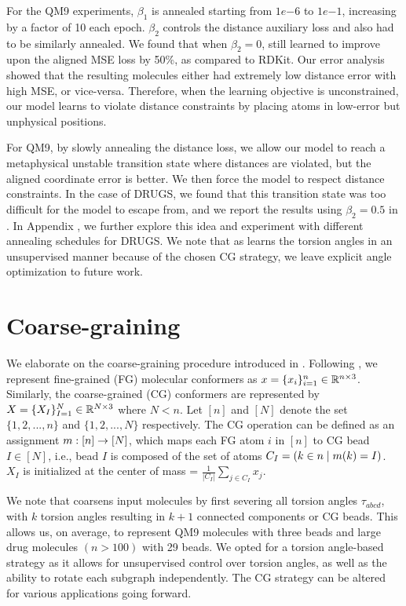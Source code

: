 For the QM9 experiments, $\beta_1$ is annealed starting from $1e{-6}$ to $1e{-1}$, increasing by a factor of 10 each epoch. $\beta_2$ controls the distance auxiliary loss and also had to be similarly annealed. We found that when $\beta_2 = 0$, \model still learned to improve upon the aligned MSE loss by 50\%, as compared to RDKit. Our error analysis showed that the resulting molecules either had extremely low distance error with high MSE, or vice-versa. Therefore, when the learning objective is unconstrained, our model learns to violate distance constraints by placing atoms in low-error but unphysical positions.

For QM9, by slowly annealing the distance loss, we allow our model to reach a metaphysical unstable transition state where distances are violated, but the aligned coordinate error is better. We then force the model to respect distance constraints. In the case of DRUGS, we found that this transition state was too difficult for the model to escape from, and we report the results using $\beta_2 = 0.5$ in . In Appendix , we further explore this idea and experiment with different annealing schedules for DRUGS. 
We note that as \model learns the torsion angles in an unsupervised manner because of the chosen CG strategy, we leave explicit angle optimization to future work.

\section{Coarse-graining}
\label{section:appendix-CG}
\vspace{-1ex}
We elaborate on the coarse-graining procedure introduced in . Following \citet{CGVAE}, we represent fine-grained (FG) molecular conformers as $x = \{x_i\}_{i=1}^n \in \mathbb{R}^{n \times 3}$. Similarly, the coarse-grained (CG) conformers are represented by $X = \{X_I\}_{I=1}^N \in \mathbb{R}^{N \times 3}$ where $N < n$.
Let $[n]$ and $[N]$ denote the set $\{1, 2, ..., n\}$ and $\{1, 2, ..., N\}$ respectively. 
The CG operation can be defined as an assignment $m: [n] \rightarrow [N]$, which maps each FG atom $i$ in  $[n]$ to CG bead $I \in [N]$, i.e., bead $I$ is composed of the set of atoms $C_{I} = (k \in n \mid m(k) = I )$. 
$X_I$ is initialized at the center of mass = $\frac{1}{|C_I|}\sum_{j \in C_I} x_j$.

We note that \model coarsens input molecules by first severing all torsion angles $\tau_{abcd}$, with $k$ torsion angles resulting in $k+1$ connected components or CG beads. This allows us, on average, to represent QM9 molecules with three beads and large drug molecules $(n>100)$ with 29 beads. We opted for a torsion angle-based strategy as it allows for unsupervised control over torsion angles, as well as the ability to rotate each subgraph independently. The CG strategy can be altered for various applications going forward.

